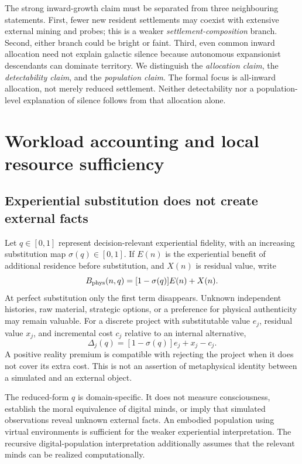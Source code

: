 \documentclass[11pt,a4paper]{article}
\theoremstyle{definition}\newtheorem{definition}{Definition}
\begin{document}
The strong inward-growth claim must be separated from three neighbouring statements. First, fewer new resident settlements may coexist with extensive external mining and probes; this is a weaker \emph{settlement-composition} branch. Second, either branch could be bright or faint. Third, even common inward allocation need not explain galactic silence because autonomous expansionist descendants can dominate territory. We distinguish the \emph{allocation claim}, the \emph{detectability claim}, and the \emph{population claim}. The formal focus is all-inward allocation, not merely reduced settlement. Neither detectability nor a population-level explanation of silence follows from that allocation alone.

\section{Workload accounting and local resource sufficiency}
\label{sec:support}

\subsection{Experiential substitution does not create external facts}

Let $q\in[0,1]$ represent decision-relevant experiential fidelity, with an increasing substitution map $\sigma(q)\in[0,1]$. If $E(n)$ is the experiential benefit of additional residence before substitution, and $X(n)$ is residual value, write
\begin{equation}
 B_{\rm phys}(n,q)=[1-\sigma(q)]E(n)+X(n).
 \label{eq:experiential}
\end{equation}
At perfect substitution only the first term disappears. Unknown independent histories, raw material, strategic options, or a preference for physical authenticity may remain valuable. For a discrete project with substitutable value $e_j$, residual value $x_j$, and incremental cost $c_j$ relative to an internal alternative,
\begin{equation}
 \Delta_j(q)=[1-\sigma(q)]e_j+x_j-c_j.
 \label{eq:premium}
\end{equation}
A positive reality premium is compatible with rejecting the project when it does not cover its extra cost. This is not an assertion of metaphysical identity between a simulated and an external object.

The reduced-form $q$ is domain-specific. It does not measure consciousness, establish the moral equivalence of digital minds, or imply that simulated observations reveal unknown external facts. An embodied population using virtual environments is sufficient for the weaker experiential interpretation. The recursive digital-population interpretation additionally assumes that the relevant minds can be realized computationally.
\end{document}
